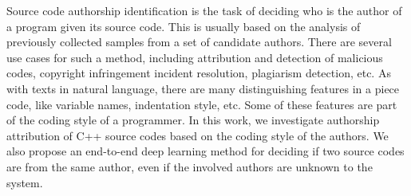 Source code authorship identification is the task of deciding who is the author of a program given its source code. This is usually based on the analysis of previously collected samples from a set of candidate authors. There are several use cases for such a method, including attribution and detection of malicious codes, copyright infringement incident resolution, plagiarism detection, etc. As with texts in natural language, there are many distinguishing features in a piece code, like variable names, indentation style, etc. Some of these features are part of the coding style of a programmer. In this work, we investigate authorship attribution of C++ source codes based on the coding style of the authors. We also propose an end-to-end deep learning method for deciding if two source codes are from the same author, even if the involved authors are unknown to the system.